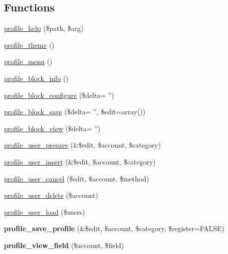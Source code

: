 \subsection*{Functions}
\begin{DoxyCompactItemize}
\item 
\hyperlink{profile_8module_a4c94451892aa2b5dd6b36c8a3f9fbe5a}{profile\_\-help} (\$path, \$arg)
\item 
\hyperlink{profile_8module_a50e30bbdc9ffae1d3251a8ff035b43a9}{profile\_\-theme} ()
\item 
\hyperlink{profile_8module_a4703cb223d8cfa6329eda4053cd64d5a}{profile\_\-menu} ()
\item 
\hyperlink{profile_8module_a99f72a059a33bba9a97302fa524775ff}{profile\_\-block\_\-info} ()
\item 
\hyperlink{profile_8module_a26b6bb6662433ae41ee22b48f6f7ba13}{profile\_\-block\_\-configure} (\$delta= '')
\item 
\hyperlink{profile_8module_a245127a283b4afa8b603d759048aaf85}{profile\_\-block\_\-save} (\$delta= '', \$edit=array())
\item 
\hyperlink{profile_8module_a6cffc3b1748880b1606c5743d9746579}{profile\_\-block\_\-view} (\$delta= '')
\item 
\hyperlink{profile_8module_ac4241448415efd43523285a54e36ab85}{profile\_\-user\_\-presave} (\&\$edit, \$account, \$category)
\item 
\hyperlink{profile_8module_a7384c7127204e134d2be695e53681f4b}{profile\_\-user\_\-insert} (\&\$edit, \$account, \$category)
\item 
\hyperlink{profile_8module_a957dcbcb6fa2fcc754d06373f1c75037}{profile\_\-user\_\-cancel} (\$edit, \$account, \$method)
\item 
\hyperlink{profile_8module_ab27b8c7b8ab4a0a4c7b3a74f89bf800c}{profile\_\-user\_\-delete} (\$account)
\item 
\hyperlink{profile_8module_a8e273f03e749b1a38f2891d138675b73}{profile\_\-user\_\-load} (\$users)
\item 
\hypertarget{profile_8module_adcffabc919de8edbe678811f274d7588}{
{\bfseries profile\_\-save\_\-profile} (\&\$edit, \$account, \$category, \$register=FALSE)}
\label{profile_8module_adcffabc919de8edbe678811f274d7588}

\item 
\hypertarget{profile_8module_a3b3203b78b975b11945f0d2003f5d9ca}{
{\bfseries profile\_\-view\_\-field} (\$account, \$field)}
\label{profile_8module_a3b3203b78b975b11945f0d2003f5d9ca}


\end{DoxyCompactItemize}

